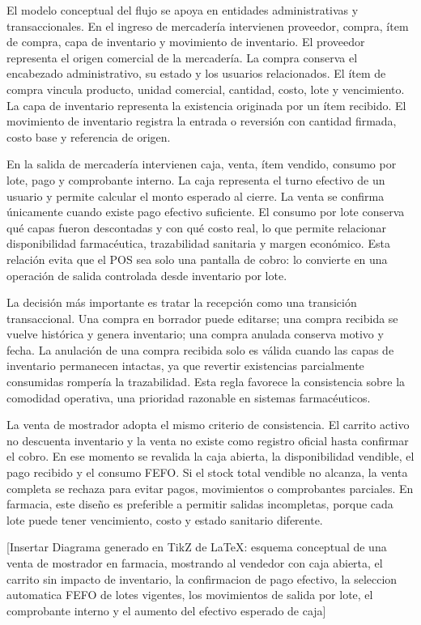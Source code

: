 El modelo conceptual del flujo se apoya en entidades administrativas y transaccionales. En el ingreso de mercadería intervienen proveedor, compra, ítem de compra, capa de inventario y movimiento de inventario. El proveedor representa el origen comercial de la mercadería. La compra conserva el encabezado administrativo, su estado y los usuarios relacionados. El ítem de compra vincula producto, unidad comercial, cantidad, costo, lote y vencimiento. La capa de inventario representa la existencia originada por un ítem recibido. El movimiento de inventario registra la entrada o reversión con cantidad firmada, costo base y referencia de origen.

En la salida de mercadería intervienen caja, venta, ítem vendido, consumo por lote, pago y comprobante interno. La caja representa el turno efectivo de un usuario y permite calcular el monto esperado al cierre. La venta se confirma únicamente cuando existe pago efectivo suficiente. El consumo por lote conserva qué capas fueron descontadas y con qué costo real, lo que permite relacionar disponibilidad farmacéutica, trazabilidad sanitaria y margen económico. Esta relación evita que el POS sea solo una pantalla de cobro: lo convierte en una operación de salida controlada desde inventario por lote.

La decisión más importante es tratar la recepción como una transición transaccional. Una compra en borrador puede editarse; una compra recibida se vuelve histórica y genera inventario; una compra anulada conserva motivo y fecha. La anulación de una compra recibida solo es válida cuando las capas de inventario permanecen intactas, ya que revertir existencias parcialmente consumidas rompería la trazabilidad. Esta regla favorece la consistencia sobre la comodidad operativa, una prioridad razonable en sistemas farmacéuticos.

La venta de mostrador adopta el mismo criterio de consistencia. El carrito activo no descuenta inventario y la venta no existe como registro oficial hasta confirmar el cobro. En ese momento se revalida la caja abierta, la disponibilidad vendible, el pago recibido y el consumo FEFO. Si el stock total vendible no alcanza, la venta completa se rechaza para evitar pagos, movimientos o comprobantes parciales. En farmacia, este diseño es preferible a permitir salidas incompletas, porque cada lote puede tener vencimiento, costo y estado sanitario diferente.

[Insertar Diagrama generado en TikZ de LaTeX: esquema conceptual de una venta de mostrador en farmacia, mostrando al vendedor con caja abierta, el carrito sin impacto de inventario, la confirmacion de pago efectivo, la seleccion automatica FEFO de lotes vigentes, los movimientos de salida por lote, el comprobante interno y el aumento del efectivo esperado de caja]

